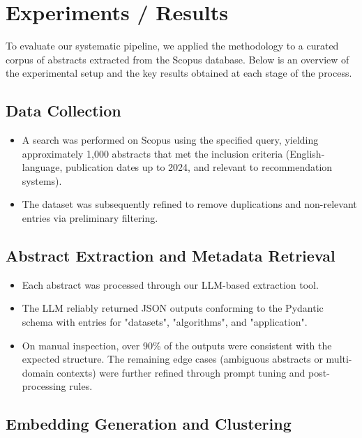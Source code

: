 \documentclass[
	a4paper, %
	10pt, %
	unnumberedsections, %
	twoside, %
]{LTJournalArticle}
\begin{document}
\section{Experiments / Results}

To evaluate our systematic pipeline, we applied the methodology to a curated corpus of abstracts extracted from the Scopus database. Below is an overview of the experimental setup and the key results obtained at each stage of the process.

\subsection{Data Collection}

\begin{itemize}
    \item A search was performed on Scopus using the specified query, yielding approximately 1,000 abstracts that met the inclusion criteria (English-language, publication dates up to 2024, and relevant to recommendation systems).    
    \item The dataset was subsequently refined to remove duplications and non-relevant entries via preliminary filtering.
\end{itemize}

\subsection{Abstract Extraction and Metadata Retrieval}

\begin{itemize}
    \item Each abstract was processed through our LLM-based extraction tool.    
    \item The LLM reliably returned JSON outputs conforming to the Pydantic schema with entries for "datasets", "algorithms", and "application".    
    \item On manual inspection, over 90\% of the outputs were consistent with the expected structure. The remaining edge cases (ambiguous abstracts or multi-domain contexts) were further refined through prompt tuning and post-processing rules.
\end{itemize}

\subsection{Embedding Generation and Clustering}
\end{document}
